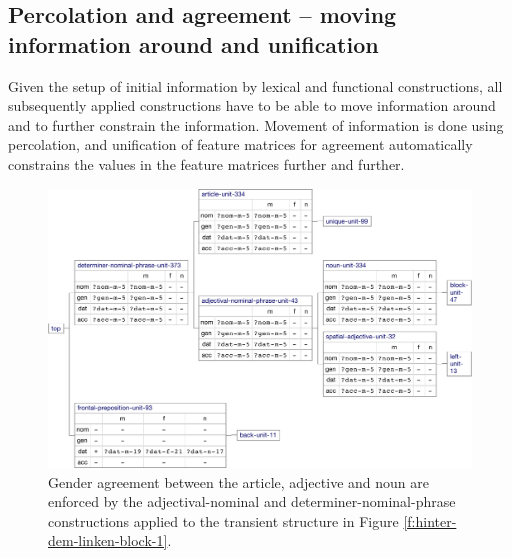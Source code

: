 \subsection{Percolation and agreement -- moving information around and unification}
Given the setup of initial information by lexical and functional
constructions, all subsequently applied constructions have to be able
to move information around and to further constrain the
information. Movement of information is done using percolation, and
unification of feature matrices for agreement automatically constrains
the values in the feature matrices further and further.

\begin{figure}[t]
  \centerline{\includegraphics[scale=0.5]{figs/hinter-dem-linken-block-2}}
  \caption[Gender agreement represented in the transient structure]{%
  Gender agreement 
  between the article, adjective and noun
  are enforced by the adjectival-nominal and
  determiner-nominal-phrase constructions applied to the transient
  structure in Figure \ref{f:hinter-dem-linken-block-1}. }
  \label{f:hinter-dem-linken-block-2}
\end{figure}

